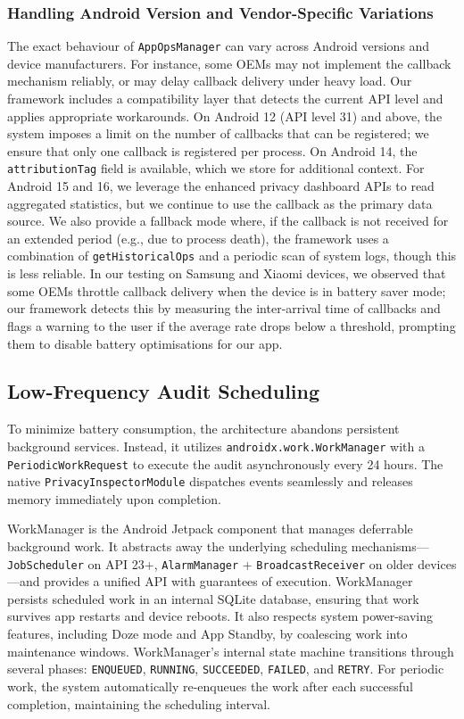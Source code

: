 \subsubsection{Handling Android Version and Vendor-Specific Variations}

The exact behaviour of \texttt{AppOpsManager} can vary across Android versions and device manufacturers. For instance, some OEMs may not implement the callback mechanism reliably, or may delay callback delivery under heavy load. Our framework includes a compatibility layer that detects the current API level and applies appropriate workarounds. On Android 12 (API level 31) and above, the system imposes a limit on the number of callbacks that can be registered; we ensure that only one callback is registered per process. On Android 14, the \texttt{attributionTag} field is available, which we store for additional context. For Android 15 and 16, we leverage the enhanced privacy dashboard APIs to read aggregated statistics, but we continue to use the callback as the primary data source. We also provide a fallback mode where, if the callback is not received for an extended period (e.g., due to process death), the framework uses a combination of \texttt{getHistoricalOps} and a periodic scan of system logs, though this is less reliable. In our testing on Samsung and Xiaomi devices, we observed that some OEMs throttle callback delivery when the device is in battery saver mode; our framework detects this by measuring the inter-arrival time of callbacks and flags a warning to the user if the average rate drops below a threshold, prompting them to disable battery optimisations for our app.

\subsection{Low-Frequency Audit Scheduling}

To minimize battery consumption, the architecture abandons persistent background services. Instead, it utilizes \texttt{androidx.work.WorkManager} with a \texttt{PeriodicWorkRequest} to execute the audit asynchronously every 24 hours. The native \texttt{PrivacyInspectorModule} dispatches events seamlessly and releases memory immediately upon completion.

WorkManager is the Android Jetpack component that manages deferrable background work. It abstracts away the underlying scheduling mechanisms—\texttt{JobScheduler} on API 23+, \texttt{AlarmManager} + \texttt{BroadcastReceiver} on older devices—and provides a unified API with guarantees of execution. WorkManager persists scheduled work in an internal SQLite database, ensuring that work survives app restarts and device reboots. It also respects system power-saving features, including Doze mode and App Standby, by coalescing work into maintenance windows. WorkManager's internal state machine transitions through several phases: \texttt{ENQUEUED}, \texttt{RUNNING}, \texttt{SUCCEEDED}, \texttt{FAILED}, and \texttt{RETRY}. For periodic work, the system automatically re-enqueues the work after each successful completion, maintaining the scheduling interval.

